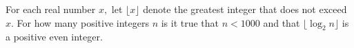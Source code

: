 For each real number $x,$ let $\lfloor x\rfloor$ denote the greatest integer that does not exceed $x.$  For how many positive integers $n$ is it true that $n<1000$ and that $\lfloor \log_2 n\rfloor$ is a positive even integer.